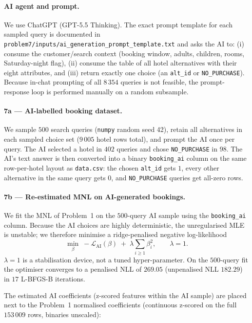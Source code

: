 \documentclass[11pt]{article}
\begin{document}
\paragraph{AI agent and prompt.}
We use ChatGPT (GPT-5.5 Thinking). The exact prompt template for each
sampled query is documented in
\texttt{problem7/inputs/ai\_generation\_prompt\_template.txt} and asks
the AI to: (i) consume the customer/search context (booking window,
adults, children, rooms, Saturday-night flag), (ii) consume the table
of all hotel alternatives with their eight attributes, and (iii) return
exactly one choice (an \texttt{alt\_id} or \texttt{NO\_PURCHASE}).
Because in-chat prompting of all $8\,354$ queries is not feasible, the
prompt-response loop is performed manually on a random subsample.

\paragraph{7a --- AI-labelled booking dataset.}
We sample $500$ search queries (\texttt{numpy} random seed 42), retain
all alternatives in each sampled choice set ($9\,005$ hotel rows total),
and prompt the AI once per query. The AI selected a hotel in $402$
queries and chose \texttt{NO\_PURCHASE} in $98$. The AI's text answer
is then converted into a binary \texttt{booking\_ai} column on the same
row-per-hotel layout as \texttt{data.csv}: the chosen \texttt{alt\_id}
gets $1$, every other alternative in the same query gets $0$, and
\texttt{NO\_PURCHASE} queries get all-zero rows.

\paragraph{7b --- Re-estimated MNL on AI-generated bookings.}
We fit the MNL of Problem~1 on the $500$-query AI sample using the
\texttt{booking\_ai} column. Because the AI choices are highly
deterministic, the unregularised MLE is unstable; we therefore
minimise a ridge-penalised negative log-likelihood
\[
\min_\beta\; -\mathcal{L}_{\text{AI}}(\beta) \;+\; \lambda \sum_{i \ge 1} \beta_i^2,
\qquad \lambda = 1.
\]
$\lambda = 1$ is a stabilisation device, not a tuned hyper-parameter.
On the $500$-query fit the optimiser converges to a penalised NLL of
$269.05$ (unpenalised NLL $182.29$) in $17$ L-BFGS-B iterations.

The estimated AI coefficients (z-scored features within the AI sample)
are placed next to the Problem~1 normalised coefficients
(continuous z-scored on the full $153\,009$ rows, binaries unscaled):
\end{document}
